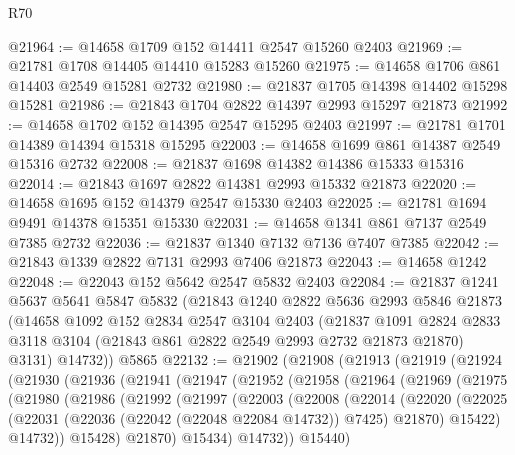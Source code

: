 \begin{lexlean}{R70}
\begin{coremodule}
@21964 := @14658 @1709 @152 @14411 @2547 @15260 @2403
@21969 := @21781 @1708 @14405 @14410 @15283 @15260
@21975 := @14658 @1706 @861 @14403 @2549 @15281 @2732
@21980 := @21837 @1705 @14398 @14402 @15298 @15281
@21986 := @21843 @1704 @2822 @14397 @2993 @15297 @21873
@21992 := @14658 @1702 @152 @14395 @2547 @15295 @2403
@21997 := @21781 @1701 @14389 @14394 @15318 @15295
@22003 := @14658 @1699 @861 @14387 @2549 @15316 @2732
@22008 := @21837 @1698 @14382 @14386 @15333 @15316
@22014 := @21843 @1697 @2822 @14381 @2993 @15332 @21873
@22020 := @14658 @1695 @152 @14379 @2547 @15330 @2403
@22025 := @21781 @1694 @9491 @14378 @15351 @15330
@22031 := @14658 @1341 @861 @7137 @2549 @7385 @2732
@22036 := @21837 @1340 @7132 @7136 @7407 @7385
@22042 := @21843 @1339 @2822 @7131 @2993 @7406 @21873
@22043 := @14658 @1242
@22048 := @22043 @152 @5642 @2547 @5832 @2403
@22084 := @21837
    @1241
    @5637
    @5641
    @5847
    @5832
    (@21843
      @1240
      @2822
      @5636
      @2993
      @5846
      @21873
      (@14658
        @1092
        @152
        @2834
        @2547
        @3104
        @2403
        (@21837
          @1091
          @2824
          @2833
          @3118
          @3104
          (@21843 @861 @2822 @2549 @2993 @2732 @21873 @21870)
          @3131)
        @14732))
    @5865
@22132 := @21902
    (@21908
      (@21913
        (@21919
          (@21924
            (@21930
              (@21936
                (@21941
                  (@21947
                    (@21952
                      (@21958
                        (@21964
                          (@21969
                            (@21975
                              (@21980
                                (@21986
                                  (@21992
                                    (@21997
                                      (@22003
                                        (@22008
                                          (@22014
                                            (@22020
                                              (@22025
                                                (@22031
                                                  (@22036 (@22042 (@22048 @22084 @14732)) @7425)
                                                  @21870)
                                                @15422)
                                              @14732))
                                          @15428)
                                        @21870)
                                      @15434)
                                    @14732))
                                @15440)

\end{coremodule}
\end{lexlean}
